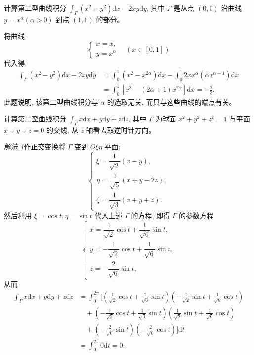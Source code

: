 \documentclass[UTF8,12pt,a4paper,fontset=fandol]{ctexart}
\begin{document}
\begin{example}\label{course-example-16-2-2}\quad 计算第二型曲线积分 $\int_\Gamma (x^2-y^2)\mathrm dx-2xy\mathrm dy$, 其中 $\Gamma$ 是从点 $(0,0)$ 沿曲线 $y=x^\alpha(\alpha>0)$ 到点 $(1,1)$ 的部分。

\end{example}
\begin{solve}\quad 将曲线
\[
  \begin{cases}
    x=x,\\
    y=x^\alpha
  \end{cases}
  \quad(x\in[0,1])
\]
代入得
\[
\begin{aligned}
  \int_\Gamma (x^2-y^2)\mathrm dx-2xy\mathrm dy
  &=\int_0^1(x^2-x^{2\alpha})\mathrm dx
    -\int_0^1 2xx^\alpha(\alpha x^{\alpha-1})\mathrm dx\\
  &=\int_0^1[x^2-(2\alpha+1)x^{2\alpha}]\mathrm dx
    =-\frac23.
\end{aligned}
\]
此题说明, 该第二型曲线积分与 $\alpha$ 的选取无关, 而只与这些曲线的端点有关。

\end{solve}
\begin{example}\label{course-example-16-2-3}\quad 计算第二型曲线积分 $\int_\Gamma x\mathrm dx+y\mathrm dy+z\mathrm dz$, 其中 $\Gamma$ 为球面 $x^2+y^2+z^2=1$ 与平面 $x+y+z=0$ 的交线, 从 $z$ 轴看去取逆时针方向。

\end{example}
\noindent\emph{解法 1}\quad 作正交变换将 $\Gamma$ 变到 $O\xi\eta$ 平面:
\[
  \begin{cases}
    \xi=\dfrac1{\sqrt2}(x-y),\\
    \eta=\dfrac1{\sqrt6}(x+y-2z),\\
    \zeta=\dfrac1{\sqrt3}(x+y+z).
  \end{cases}
\]
然后利用 $\xi=\cos t,\eta=\sin t$ 代入上述 $\Gamma$ 的方程, 即得 $\Gamma$ 的参数方程
\[
  \begin{cases}
    x=\dfrac1{\sqrt2}\cos t+\dfrac1{\sqrt6}\sin t,\\
    y=-\dfrac1{\sqrt2}\cos t+\dfrac1{\sqrt6}\sin t,\\
    z=-\dfrac2{\sqrt6}\sin t,
  \end{cases}
\]
从而
\[
\begin{aligned}
  \int_\Gamma x\mathrm dx+y\mathrm dy+z\mathrm dz
  &=\int_0^{2\pi}\bigg[
    \left(\frac1{\sqrt2}\cos t+\frac1{\sqrt6}\sin t\right)
    \left(-\frac1{\sqrt2}\sin t+\frac1{\sqrt6}\cos t\right)\\
  &\quad+
    \left(-\frac1{\sqrt2}\cos t+\frac1{\sqrt6}\sin t\right)
    \left(\frac1{\sqrt2}\sin t+\frac1{\sqrt6}\cos t\right)\\
  &\quad+
    \left(-\frac2{\sqrt6}\sin t\right)
    \left(-\frac2{\sqrt6}\cos t\right)
  \bigg]\mathrm dt\\
  &=\int_0^{2\pi}0\mathrm dt=0.
\end{aligned}
\]
\end{document}
